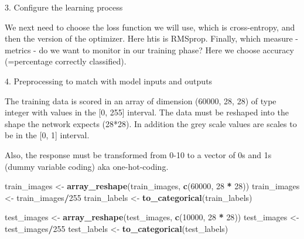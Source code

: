 \documentclass[10pt,ignorenonframetext,]{beamer}
\newenvironment{Shaded}{\begin{snugshade}}{\end{snugshade}}
\newcommand{\KeywordTok}[1]{\textcolor[rgb]{0.13,0.29,0.53}{\textbf{#1}}}
\newcommand{\DataTypeTok}[1]{\textcolor[rgb]{0.13,0.29,0.53}{#1}}
\newcommand{\DecValTok}[1]{\textcolor[rgb]{0.00,0.00,0.81}{#1}}
\newcommand{\StringTok}[1]{\textcolor[rgb]{0.31,0.60,0.02}{#1}}
\newcommand{\OperatorTok}[1]{\textcolor[rgb]{0.81,0.36,0.00}{\textbf{#1}}}
\newcommand{\NormalTok}[1]{#1}
\begin{document}
\begin{frame}[fragile]

\begin{block}{3. Configure the learning process}

We next need to choose the loss function we will use, which is
cross-entropy, and then the version of the optimizer. Here htis is
RMSprop. Finally, which measure - metrics - do we want to monitor in our
training phase? Here we choose accuracy (=percentage correctly
classified).

\begin{Shaded}
\end{Shaded}

\end{block}

\end{frame}

\begin{frame}[fragile]

\begin{block}{4. Preprocessing to match with model inputs and outputs}

The training data is scored in an array of dimension (60000, 28, 28) of
type integer with values in the {[}0, 255{]} interval. The data must be
reshaped into the shape the network expects (28*28). In addition the
grey scale values are scales to be in the {[}0, 1{]} interval.

Also, the response must be transformed from 0-10 to a vector of 0s and
1s (dummy variable coding) aka one-hot-coding.

\begin{Shaded}
\begin{Highlighting}[]
\NormalTok{train_images <-}\StringTok{ }\KeywordTok{array_reshape}\NormalTok{(train_images, }\KeywordTok{c}\NormalTok{(}\DecValTok{60000}\NormalTok{, }\DecValTok{28} \OperatorTok{*}\StringTok{ }\DecValTok{28}\NormalTok{))}
\NormalTok{train_images <-}\StringTok{ }\NormalTok{train_images}\OperatorTok{/}\DecValTok{255}
\NormalTok{train_labels <-}\StringTok{ }\KeywordTok{to_categorical}\NormalTok{(train_labels)}

\NormalTok{test_images <-}\StringTok{ }\KeywordTok{array_reshape}\NormalTok{(test_images, }\KeywordTok{c}\NormalTok{(}\DecValTok{10000}\NormalTok{, }\DecValTok{28} \OperatorTok{*}\StringTok{ }\DecValTok{28}\NormalTok{))}
\NormalTok{test_images <-}\StringTok{ }\NormalTok{test_images}\OperatorTok{/}\DecValTok{255}
\NormalTok{test_labels <-}\StringTok{ }\KeywordTok{to_categorical}\NormalTok{(test_labels)}
\end{Highlighting}
\end{Shaded}

\end{block}

\end{frame}
\end{document}
